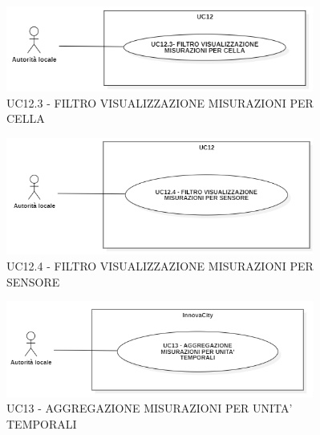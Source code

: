 \begin{figure}[H]
    \centering
    \includegraphics[width=0.9\textwidth]{../Images/uc12.3.PNG}
    \caption{UC12.3 - FILTRO VISUALIZZAZIONE MISURAZIONI PER CELLA}
\end{figure}

\begin{figure}[H]
    \centering
    \includegraphics[width=0.9\textwidth]{../Images/uc12.4.PNG}
    \caption{UC12.4 - FILTRO VISUALIZZAZIONE MISURAZIONI PER SENSORE}
\end{figure}

\begin{figure}[H]
    \centering
    \includegraphics[width=0.9\textwidth]{../Images/uc13.PNG}
    \caption{UC13 - AGGREGAZIONE MISURAZIONI PER UNITA' TEMPORALI}
\end{figure}



